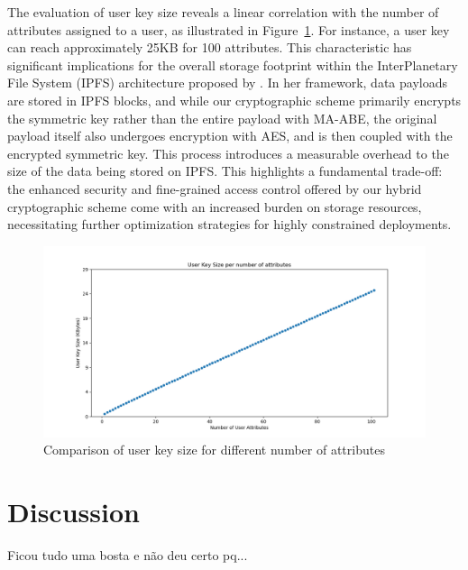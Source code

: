 \documentclass[cic,tc,english]{iiufrgs}
\begin{document}
            The evaluation of user key size reveals a linear correlation with the number of attributes assigned to a user, as illustrated in Figure~\ref{fig:user_key_size}. For instance, a user key can reach approximately 25KB for 100 attributes. This characteristic has significant implications for the overall storage footprint within the InterPlanetary File System (IPFS) architecture proposed by \citet{laura2023}. In her framework, data payloads are stored in IPFS blocks, and while our cryptographic scheme primarily encrypts the symmetric key rather than the entire payload with MA-ABE, the original payload itself also undergoes encryption with AES, and is then coupled with the encrypted symmetric key. This process introduces a measurable overhead to the size of the data being stored on IPFS. This highlights a fundamental trade-off: the enhanced security and fine-grained access control offered by our hybrid cryptographic scheme come with an increased burden on storage resources, necessitating further optimization strategies for highly constrained deployments.


            \begin{figure}
                \centering
                \includegraphics[width=\textwidth]{images/key_size_analysis/user_key_size_analysis.png}
                \caption{Comparison of user key size for different number of attributes}
                \label{fig:user_key_size}
            \end{figure}


        \section{Discussion}
            \label{sec:discussion}
            Ficou tudo uma bosta e não deu certo pq...
\end{document}
